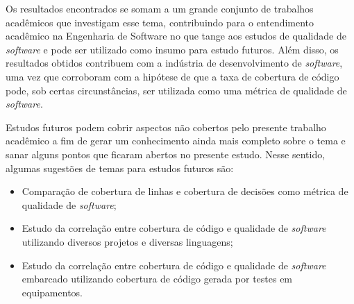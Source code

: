\documentclass[11.5pt]{article}
\begin{document}
Os resultados encontrados se somam a um grande conjunto de trabalhos acadêmicos que investigam esse
tema, contribuindo para o entendimento acadêmico na Engenharia de Software no que tange aos estudos
de qualidade de \textit{software} e pode ser utilizado como insumo para estudo futuros.
Além disso, os resultados obtidos contribuem com a indústria de desenvolvimento de
\textit{software}, uma vez que corroboram com a hipótese de que a taxa de cobertura de código pode,
sob certas circunstâncias, ser utilizada como uma métrica de qualidade de \textit{software}.

Estudos futuros podem cobrir aspectos não cobertos pelo presente trabalho acadêmico a fim de gerar
um conhecimento ainda mais completo sobre o tema e sanar alguns pontos que ficaram abertos no
presente estudo.
Nesse sentido, algumas sugestões de temas para estudos futuros são:
\begin{itemize}
    \item Comparação de cobertura de linhas e cobertura de decisões como métrica de qualidade de
          \textit{software};

    \item Estudo da correlação entre cobertura de código e qualidade de \textit{software}
          utilizando diversos projetos e diversas linguagens;

    \item Estudo da correlação entre cobertura de código e qualidade de \textit{software}
          embarcado utilizando cobertura de código gerada por testes em equipamentos.
\end{itemize}


\clearpage




\end{document}
